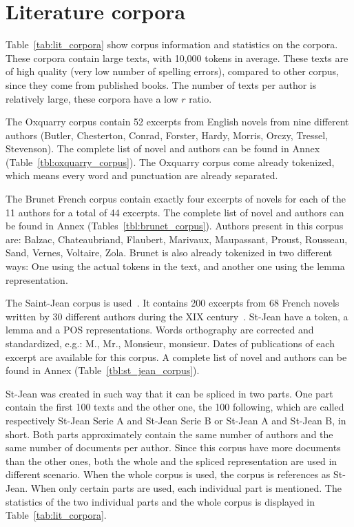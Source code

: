 \section{Literature corpora \label{sec:lit_corpus}}

Table~\ref{tab:lit_corpora} show corpus information and statistics on the corpora.
These corpora contain large texts, with 10,000 tokens in average.
These texts are of high quality (very low number of spelling errors), compared to other corpus, since they come from published books.
The number of texts per author is relatively large, these corpora have a low $r$ ratio.

The Oxquarry corpus contain 52 excerpts from English novels from nine different authors (Butler, Chesterton, Conrad, Forster, Hardy, Morris, Orczy, Tressel, Stevenson).
The complete list of novel and authors can be found in Annex (Table~\ref{tbl:oxquarry_corpus}).
The Oxquarry corpus come already tokenized, which means every word and punctuation are already separated.

The Brunet French corpus contain exactly four excerpts of novels for each of the 11 authors for a total of 44 excerpts.
The complete list of novel and authors can be found in Annex (Tables~\ref{tbl:brunet_corpus}).
Authors present in this corpus are: Balzac, Chateaubriand, Flaubert, Marivaux, Maupassant, Proust, Rousseau, Sand, Vernes, Voltaire, Zola.
Brunet is also already tokenized in two different ways: One using the actual tokens in the text, and another one using the lemma representation.

The Saint-Jean corpus is used~\cite{unine_corpus}.
It contains 200 excerpts from 68 French novels written by 30 different authors during the XIX century~\cite{st_jean}.
St-Jean have a token, a lemma and a POS representations.
Words orthography are corrected and standardized, e.g.: M., Mr., Monsieur, monsieur.
Dates of publications of each excerpt are available for this corpus.
A complete list of novel and authors can be found in Annex (Table~\ref{tbl:st_jean_corpus}).

St-Jean was created in such way that it can be spliced in two parts.
One part contain the first 100 texts and the other one, the 100 following, which are called respectively St-Jean Serie A and St-Jean Serie B or St-Jean A and St-Jean B, in short.
Both parts approximately contain the same number of authors and the same number of documents per author.
Since this corpus have more documents than the other ones, both the whole and the spliced representation are used in different scenario.
When the whole corpus is used, the corpus is references as St-Jean.
When only certain parts are used, each individual part is mentioned.
The statistics of the two individual parts and the whole corpus is displayed in Table~\ref{tab:lit_corpora}.

